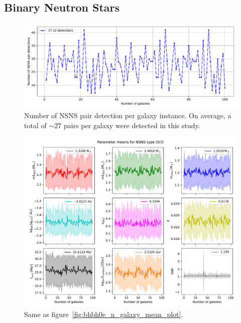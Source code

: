 \subsection{Binary Neutron Stars}
\begin{figure}[!h]
    \centering
    \includegraphics[width=\columnwidth]{analysis_data/004__images_for_latex/NSNS0e_n_detections}
    \caption{Number of NSNS pair detection per galaxy instance. On average, a total of $\sim$27 pairs per galaxy were detected in this study.}
    \label{fig:nsns0endetections}
\end{figure}

\begin{figure}[!h]
    \centering
    \includegraphics[width=\columnwidth]{analysis_data/004__images_for_latex/NSNS0e_n_galaxy_mean_plot}
    \caption{Same as figure~\ref{fig:bhbh0e_n_galaxy_mean_plot}.}
    \label{fig:nsns0e_n_galaxy_mean_plot}
\end{figure}

